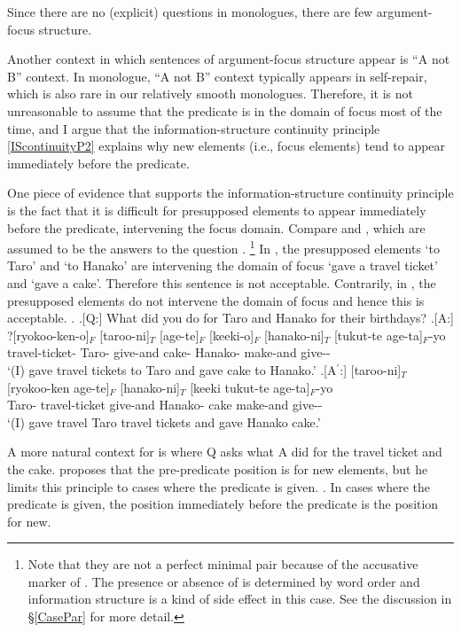 Since there are no (explicit) questions in monologues,
there are few argument-focus structure.

Another context in which sentences of argument-focus structure appear is ``A not B'' context.
In monologue, ``A not B'' context typically appears in self-repair,
which is also rare in our relatively smooth monologues.
Therefore, it is not unreasonable to assume that the predicate is in the domain of focus most of the time,
and I argue that the information-structure continuity principle \ref{IScontinuityP2} explains why new elements (i.e., focus elements) tend to appear immediately before the predicate.

One piece of evidence that supports the information-structure continuity principle is the fact that
it is difficult for presupposed elements to appear immediately before the predicate,
intervening the focus domain.
Compare \Next[A] and \Next[A$^{\prime}$],
which are assumed to be the answers to the question \Next[Q].%
	\footnote{
	Note that they are not a perfect minimal pair because of the accusative marker of .
	The presence or absence of  is determined by word order and
	information structure is a kind of side effect in this case.
	See the discussion in \S \ref{CasePar} for more detail.
	}
In \Next[A],
the presupposed elements  `to Taro' and  `to Hanako' are intervening the domain of focus `gave a travel ticket' and `gave a cake'.
Therefore this sentence is not acceptable.
Contrarily, in \Next[A$^{\prime}$],
the presupposed elements do not intervene the domain of focus and hence this is acceptable.
%
\ex.
 \a.[Q:] What did you do for Taro and Hanako for their birthdays?
 \bg.[A:] ?[ryokoo-ken-o]$_{F}$ [taroo-ni]$_{T}$ [age-te]$_{F}$ [keeki-o]$_{F}$ [hanako-ni]$_{T}$ [tukut-te age-ta]$_{F}$-yo \\
 			travel-ticket- Taro- give-and cake- Hanako- make-and give-- \\
			`(I) gave travel tickets to Taro and gave cake to Hanako.'
 \bg.[A$^{\prime}$:] [taroo-ni]$_{T}$ [ryokoo-ken age-te]$_{F}$ [hanako-ni]$_{T}$ [keeki tukut-te age-ta]$_{F}$-yo \\
 			Taro- travel-ticket give-and Hanako- cake make-and give-- \\
			`(I) gave travel Taro travel tickets and gave Hanako cake.'

A more natural context for \Last[A] is where Q asks
what A did for the travel ticket and the cake.
 proposes that
the pre-predicate position is for new elements,
but he limits this principle to cases
where the predicate is given.
%
\ex.
 In cases where the predicate is given,
 the position immediately before the predicate is the position for new.
 \hfill{\cite[][p.~60, translated by the current author]{kuno78}}

